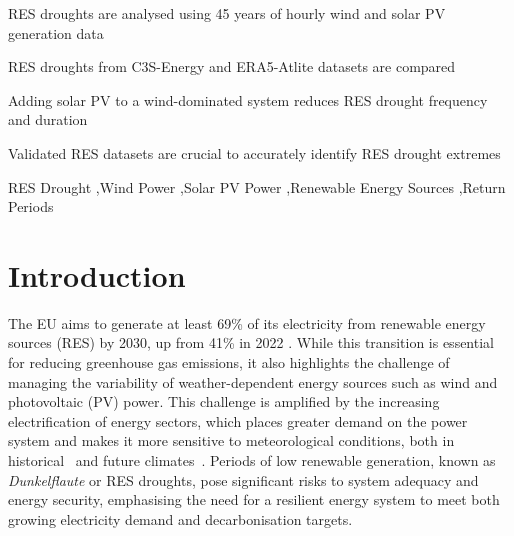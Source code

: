 \documentclass[preprint, 12pt]{elsarticle}
\begin{document}
\begin{frontmatter}
\begin{highlights}
\item RES droughts are analysed using 45 years of hourly wind and solar PV generation data

\item RES droughts from C3S-Energy and ERA5-Atlite datasets are compared

\item Adding solar PV to a wind-dominated system reduces RES drought frequency and duration

\item Validated RES datasets are crucial to accurately identify RES drought extremes

\end{highlights}

\begin{keyword}
RES Drought \sep Wind Power \sep Solar PV Power \sep Renewable Energy Sources \sep Return Periods

\end{keyword}

\end{frontmatter}

\linenumbers

\section{Introduction}
\label{sec:intro}

The EU aims to generate at least 69\% of its electricity from renewable energy sources (RES) by 2030, up from 41\% in 2022 \citep{eurostat2023share}. While this transition is essential for reducing greenhouse gas emissions, it also highlights the challenge of managing the variability of weather-dependent energy sources such as wind and photovoltaic (PV) power. This challenge is amplified by the increasing electrification of energy sectors, which places greater demand on the power system and makes it more sensitive to meteorological conditions, both in historical~\citep{bloomfield2016} and future climates~\citep{bloomfield2021}. Periods of low renewable generation, known as \textit{Dunkelflaute} or RES droughts, pose significant risks to system adequacy and energy security, emphasising the need for a resilient energy system to meet both growing electricity demand and decarbonisation targets.
\end{document}
